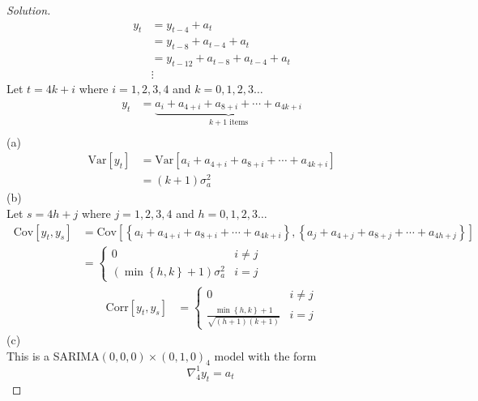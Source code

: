 \documentclass[UTF8,a4paper,14pt]{ctexart}
\newcommand{\Var}{\mathrm{Var}}
\newcommand{\Cov}{\mathrm{Cov}}
\newcommand{\Corr}{\mathrm{Corr}}
\newenvironment{solution}
  {\renewcommand\qedsymbol{$\blacksquare$}\begin{proof}[Solution]}
  {\end{proof}}
\theoremstyle{definition}
\theoremstyle{remark}
\begin{document}
\begin{solution}
  \begin{equation}\
    \begin{aligned}
      y_t &= y_{t-4} + a_t\\
      &= y_{t-8} + a_{t-4} + a_t\\
      &= y_{t-12} + a_{t-8} + a_{t-4} + a_t\\
      &\vdots
    \end{aligned}
  \end{equation}
  Let \(t=4k+i\) where \(i = 1,2,3,4\) and \(k = 0,1,2,3\ldots\)
  \begin{equation}\
    \begin{aligned}
      y_t &= \underset{k+1 \text{ items}}{\underbrace{a_i +a_{4+i} +a_{8+i} +\cdots +a_{4k+i}}}\\
    \end{aligned}
  \end{equation}
  (a)\\
  \begin{equation}\
    \begin{aligned}
      \Var[y_t] &= \Var[a_i +a_{4+i} +a_{8+i} +\cdots +a_{4k+i}]\\
      &=(k+1)\sigma_a^2
    \end{aligned}
  \end{equation}
  (b)\\
  Let \(s=4h+j\) where \(j = 1,2,3,4\) and \(h = 0,1,2,3\ldots\)
  \begin{equation}\
    \begin{aligned}
      \Cov[y_t, y_s] &= \Cov[\left\{a_i +a_{4+i} +a_{8+i} +\cdots +a_{4k+i}\right\},\left\{a_j +a_{4+j} +a_{8+j} +\cdots +a_{4h+j}\right\}]\\
      &=\begin{cases}
        0 & i\neq j\\
        (\min{\left\{{h,k}\right\}}+1)\sigma_a^2 & i=j
      \end{cases}
    \end{aligned}
  \end{equation}
  \begin{equation}\
    \begin{aligned}
  \Corr[y_t, y_s] &= \begin{cases}
    0 & i\neq j\\
    \frac{\min{\left\{{h,k}\right\}}+1}{\sqrt{(h+1)(k+1)}} & i=j
  \end{cases}
\end{aligned}
\end{equation}
(c)\\
This is a SARIMA\((0,0,0)\times(0,1,0)_4\) model with the form
\[\nabla_4^1 y_t = a_t\]


\end{solution}
\end{document}
